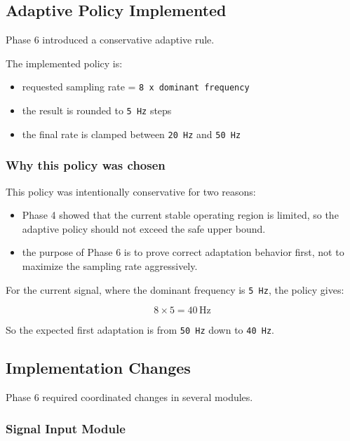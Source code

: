 \documentclass[12pt,a4paper]{article}
\begin{document}
\subsection{Adaptive Policy Implemented}

Phase 6 introduced a conservative adaptive rule.

The implemented policy is:

\begin{itemize}
    \item requested sampling rate = \texttt{8 x dominant frequency}
    \item the result is rounded to \texttt{5 Hz} steps
    \item the final rate is clamped between \texttt{20 Hz} and \texttt{50 Hz}
\end{itemize}

\subsubsection*{Why this policy was chosen}

This policy was intentionally conservative for two reasons:

\begin{itemize}
    \item Phase 4 showed that the current stable operating region is limited,
    so the adaptive policy should not exceed the safe upper bound.
    \item the purpose of Phase 6 is to prove correct adaptation behavior first,
    not to maximize the sampling rate aggressively.
\end{itemize}

For the current signal, where the dominant frequency is \texttt{5 Hz}, the
policy gives:

\[
8 \times 5 = 40\,\mathrm{Hz}
\]

So the expected first adaptation is from \texttt{50 Hz} down to
\texttt{40 Hz}.

\subsection{Implementation Changes}

Phase 6 required coordinated changes in several modules.

\subsubsection{Signal Input Module}
\end{document}
